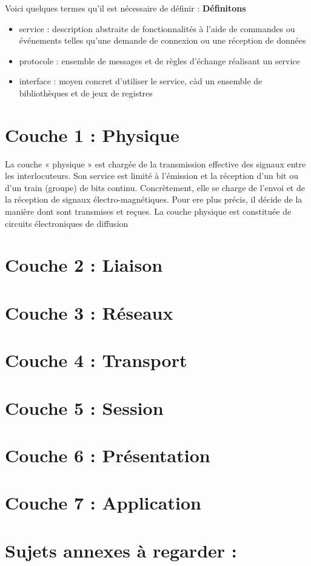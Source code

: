 \documentclass{article}
\begin{document}
Voici quelques termes qu'il est nécessaire de définir :
\textbf{Définitons}
\begin{itemize}
    \item service : description abstraite de fonctionnalités à l'aide de commandes ou événements telles qu'une demande de connexion ou une réception de données
    \item protocole : ensemble de messages et de règles d'échange réalisant un service
    \item interface : moyen concret d'utiliser le service, càd un ensemble de bibliothèques et de jeux de registres
\end{itemize}

\section{Couche 1 : Physique}
La couche « physique » est chargée de la transmission effective des signaux entre les interlocuteurs. Son service est limité à l'émission et la réception d'un bit ou d'un train (groupe) de bits continu. Concrètement, elle se charge de l'envoi et de la réception de signaux électro-magnétiques. Pour ere plus précis, il décide de la manière dont sont transmises et reçues. La couche physique est constituée de circuits électroniques de diffusion
\section{Couche 2 : Liaison}
\section{Couche 3 : Réseaux}
\section{Couche 4 : Transport}
\section{Couche 5 : Session}
\section{Couche 6 : Présentation}
\section{Couche 7 : Application}


\section{Sujets annexes à regarder :}
\end{document}
